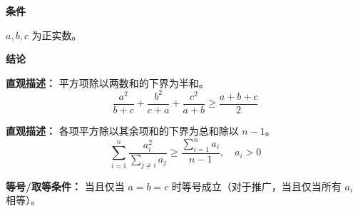 \begin{statementbox}

\textbf{\textcolor{CStatement}{条件}}
\begin{description}[style=nextline, leftmargin=2.8em, labelsep=0.5em, itemsep=0.35em]
    \item[\textbf{\textcolor{CStatement}{条件 1（正实数）：}}] $a, b, c$ 为正实数。
\end{description}

\textbf{\textcolor{CStatement}{结论}}
\begin{description}[style=nextline, leftmargin=2.8em, labelsep=0.5em, itemsep=0.45em]
    \item[\textbf{\textcolor{CStatement}{结论一（三元权方和）：}}]
    \textbf{\textcolor{CStatement}{直观描述：}} 平方项除以两数和的下界为半和。
    \[
    \frac{a^{2}}{b+c} + \frac{b^{2}}{c+a} + \frac{c^{2}}{a+b} \geq \frac{a+b+c}{2}
    \]

    \item[\textbf{\textcolor{CStatement}{推广结论（n元形式）：}}]
    \textbf{\textcolor{CStatement}{直观描述：}} 各项平方除以其余项和的下界为总和除以 $n-1$。
    \[
    \sum_{i=1}^{n} \frac{a_i^{2}}{\sum_{j\neq i} a_j} \geq \frac{\sum_{i=1}^{n} a_i}{n-1}, \quad a_i > 0
    \]
\end{description}

\textbf{\textcolor{CStatement}{等号/取等条件：}} 当且仅当 $a = b = c$ 时等号成立（对于推广，当且仅当所有 $a_i$ 相等）。

\end{statementbox}
